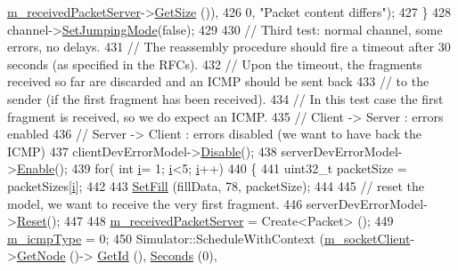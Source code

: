 \begin{DoxyCode}
      \hyperlink{classIpv4FragmentationTest_a1cda7da1e37a2413ce73e54a395ecf4a}{m\_receivedPacketServer}->\hyperlink{classns3_1_1Packet_a462855c9929954d4301a4edfe55f4f1c}{GetSize} ()),
426                              0, \textcolor{stringliteral}{"Packet content differs"});
427     \}
428   channel->\hyperlink{classns3_1_1ErrorChannel_aa30b3b76ca1fc19aa68e28bd21431131}{SetJumpingMode}(\textcolor{keyword}{false});
429 
430   \textcolor{comment}{// Third test: normal channel, some errors, no delays.}
431   \textcolor{comment}{// The reassembly procedure should fire a timeout after 30 seconds (as specified in the RFCs).}
432   \textcolor{comment}{// Upon the timeout, the fragments received so far are discarded and an ICMP should be sent back}
433   \textcolor{comment}{// to the sender (if the first fragment has been received).}
434   \textcolor{comment}{// In this test case the first fragment is received, so we do expect an ICMP.}
435   \textcolor{comment}{// Client -> Server : errors enabled}
436   \textcolor{comment}{// Server -> Client : errors disabled (we want to have back the ICMP)}
437   clientDevErrorModel->\hyperlink{classns3_1_1ErrorModel_a55d35a3e713c31f650577e9f96cf25c0}{Disable}();
438   serverDevErrorModel->\hyperlink{classns3_1_1ErrorModel_a571d61a2fc9ce2d30df95da7e87b763c}{Enable}();
439   \textcolor{keywordflow}{for}( \textcolor{keywordtype}{int} \hyperlink{bernuolliDistribution_8m_a6f6ccfcf58b31cb6412107d9d5281426}{i}= 1; \hyperlink{bernuolliDistribution_8m_a6f6ccfcf58b31cb6412107d9d5281426}{i}<5; \hyperlink{bernuolliDistribution_8m_a6f6ccfcf58b31cb6412107d9d5281426}{i}++)
440     \{
441       uint32\_t packetSize = packetSizes[\hyperlink{bernuolliDistribution_8m_a6f6ccfcf58b31cb6412107d9d5281426}{i}];
442 
443       \hyperlink{classIpv4FragmentationTest_af2de35c56cd4b51230784881bd1221a8}{SetFill} (fillData, 78, packetSize);
444 
445       \textcolor{comment}{// reset the model, we want to receive the very first fragment.}
446       serverDevErrorModel->\hyperlink{classns3_1_1ErrorModel_a6b7cbe56c27562e5ba6daf2f04bcd282}{Reset}();
447 
448       \hyperlink{classIpv4FragmentationTest_a1cda7da1e37a2413ce73e54a395ecf4a}{m\_receivedPacketServer} = Create<Packet> ();
449       \hyperlink{classIpv4FragmentationTest_a2ee305a2995a09b8b2faf2ecf700c90d}{m\_icmpType} = 0;
450       Simulator::ScheduleWithContext (\hyperlink{classIpv4FragmentationTest_a75297f7fa134ce427f34f866c4372877}{m\_socketClient}->\hyperlink{classns3_1_1Socket_aba642ad4301c1df47befc0aa9afa2e48}{GetNode} ()->
      \hyperlink{classns3_1_1Node_aaf49b64a843565ce3812326313b370ac}{GetId} (), \hyperlink{group__timecivil_ga33c34b816f8ff6628e33d5c8e9713b9e}{Seconds} (0),

\end{DoxyCode}
